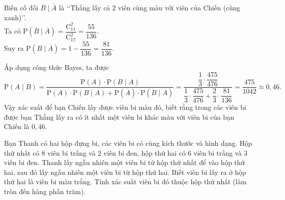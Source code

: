 \begin{bt}
{\begin{itemize}
			Biến cố đối $\overline{B}\mid \overline{A}$ là \lq\lq Thắng lấy cả $2$ viên cùng màu với viên của Chiến (cùng xanh)\rq\rq. \\ Ta có  $\mathrm{P}\left(\overline{B}\mid \overline{A}\right)=\dfrac{\mathrm{C}_{11}^{2}}{\mathrm{C}_{17}^{2}}=\dfrac{55}{136}$. \\
			Suy ra  $\mathrm{P}\left(B\mid \overline{A}\right)=1-\dfrac{55}{136}=\dfrac{81}{136}$.
		\end{itemize}
		Áp dụng công thức Bayes, ta được $$\mathrm{P}\left(A\mid B\right)=\dfrac{\mathrm{P}\left(A\right)\cdot\mathrm{P}\left(B\mid A\right)}{\mathrm{P}\left(A\right)\cdot\mathrm{P}\left(B\mid A\right)+\mathrm{P}\left(\overline{A}\right)\cdot\mathrm{P}\left(B\mid  \overline{A}\right)}=\dfrac{\dfrac{1}{3}\cdot\dfrac{475}{476}}{\dfrac{1}{3}\cdot\dfrac{475}{476}+\dfrac{2}{3}\cdot\dfrac{81}{136}}= \dfrac{475}{1042}\approx 0{,}46.$$
		Vậy xác suất  để bạn Chiến lấy được viên bi màu đỏ, biết rằng trong các viên bi được bạn Thắng lấy ra có ít nhất một viên bi khác màu với viên bi của bạn Chiến là $0{,}46$.
	 }
\end{bt}

\begin{bt}%
	Bạn Thanh có hai hộp đựng bi, các viên bi có cùng kích thước và hình dạng. Hộp thứ nhất có $8$ viên bi trắng và $2$ viên bi đen, hộp  thứ hai có $6$ viên bi trắng và $3$ viên bi đen. Thanh lấy ngẫu nhiên một viên bi từ hộp thứ nhất để vào hộp thứ hai, sau đó lấy ngẫu nhiên một viên bi từ hộp thứ hai. Biết viên bi lấy ra ở hộp thứ hai là viên bi màu trắng. Tính xác suất viên bi đó thuộc hộp thứ nhất (làm tròn đến hàng phần trăm).
\end{bt}

